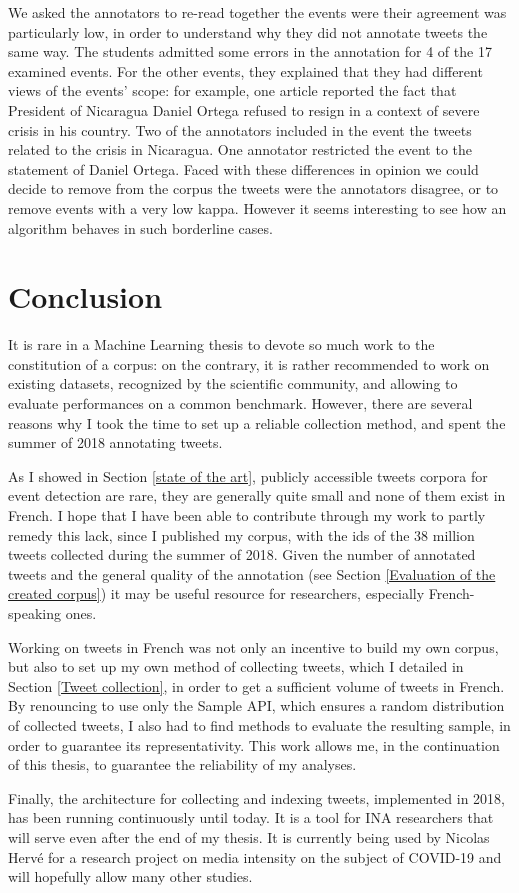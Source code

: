 We asked the annotators to re-read together the events were their agreement was particularly low, in order to understand why they did not annotate tweets the same way. The students admitted some errors in the annotation for 4 of the 17 examined events. For the other events, they explained that they had different views of the events' scope: for example, one article reported the fact that President of Nicaragua Daniel Ortega refused to resign in a context of severe crisis in his country. Two of the annotators included in the event the tweets related to the crisis in Nicaragua. One annotator restricted the event to the statement of Daniel Ortega. Faced with these differences in opinion we could decide to remove from the corpus the tweets were the annotators disagree, or to remove events with a very low kappa. However it seems interesting to see how an algorithm behaves in such borderline cases.


\section{Conclusion}

It is rare in a Machine Learning thesis to devote so much work to the constitution of a corpus: on the contrary, it is rather recommended to work on existing datasets, recognized by the scientific community, and allowing to evaluate  performances on a common benchmark. However, there are several reasons why I took the time to set up a reliable collection method, and spent the summer of 2018 annotating tweets. 

As I showed in Section \ref{state of the art}, publicly accessible tweets corpora for event detection are rare, they are generally quite small and none of them exist in French. I hope that I have been able to contribute through my work to partly remedy this lack, since I published my corpus, with the ids of the 38 million tweets collected during the summer of 2018. Given the number of annotated tweets and the general quality of the annotation (see Section \ref{Evaluation of the created corpus}) it may be useful resource for researchers, especially French-speaking ones.


Working on tweets in French was not only an incentive to build my own corpus, but also to set up my own method of collecting tweets, which I detailed in Section \ref{Tweet collection}, in order to get a sufficient volume of tweets in French. By renouncing to use only the Sample API, which ensures a random distribution of collected tweets, I also had to find methods to evaluate the resulting sample, in order to guarantee its representativity. This work allows me, in the continuation of this thesis, to guarantee the reliability of my analyses.


Finally, the architecture for collecting and indexing tweets, implemented in 2018, has been running continuously until today. It is a tool for INA researchers that will serve even after the end of my thesis. It is currently being used by Nicolas Hervé for a research project on media intensity on the subject of COVID-19  and will hopefully allow many other studies.